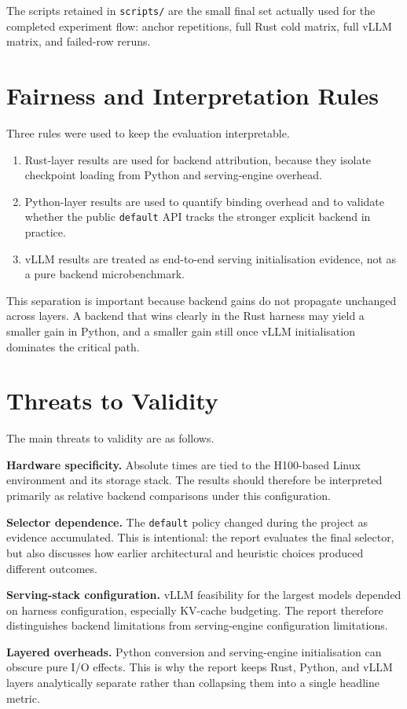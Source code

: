 The scripts retained in \texttt{scripts/} are the small final set actually used for the completed experiment flow: anchor repetitions, full Rust cold matrix, full vLLM matrix, and failed-row reruns.

\section{Fairness and Interpretation Rules}

Three rules were used to keep the evaluation interpretable.

\begin{enumerate}
\item Rust-layer results are used for backend attribution, because they isolate checkpoint loading from Python and serving-engine overhead.
\item Python-layer results are used to quantify binding overhead and to validate whether the public \texttt{default} API tracks the stronger explicit backend in practice.
\item vLLM results are treated as end-to-end serving initialisation evidence, not as a pure backend microbenchmark.
\end{enumerate}

This separation is important because backend gains do not propagate unchanged across layers. A backend that wins clearly in the Rust harness may yield a smaller gain in Python, and a smaller gain still once vLLM initialisation dominates the critical path.

\section{Threats to Validity}

The main threats to validity are as follows.

\textbf{Hardware specificity.} Absolute times are tied to the H100-based Linux environment and its storage stack. The results should therefore be interpreted primarily as relative backend comparisons under this configuration.

\textbf{Selector dependence.} The \texttt{default} policy changed during the project as evidence accumulated. This is intentional: the report evaluates the final selector, but also discusses how earlier architectural and heuristic choices produced different outcomes.

\textbf{Serving-stack configuration.} vLLM feasibility for the largest models depended on harness configuration, especially KV-cache budgeting. The report therefore distinguishes backend limitations from serving-engine configuration limitations.

\textbf{Layered overheads.} Python conversion and serving-engine initialisation can obscure pure I/O effects. This is why the report keeps Rust, Python, and vLLM layers analytically separate rather than collapsing them into a single headline metric.

